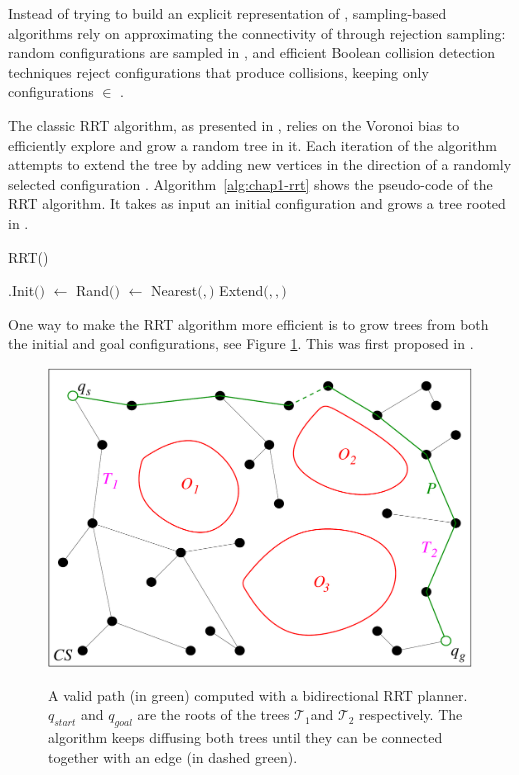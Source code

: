 Instead of trying to build an explicit representation of \cfree,
sampling-based algorithms rely on approximating the connectivity
of \cfree through rejection sampling: random configurations
 are sampled in \cspace, and efficient Boolean collision
detection techniques \cite{vand97, huds97, gott96} reject
configurations that produce collisions, keeping only configurations
\config{} $\in$ \cfree.

The classic RRT algorithm, as presented in \cite{kuff00}, relies on
the Voronoi bias to efficiently explore \cfree and grow a random tree
in it. Each iteration of the algorithm attempts to extend the tree by
adding new vertices in the direction of a randomly selected
configuration . Algorithm~\ref{alg:chap1-rrt} shows the
pseudo-code of the RRT algorithm. It takes as input an initial
configuration  and grows a tree \ctree rooted in .

\begin{algorithm}
\caption{RRT()}
\label{alg:chap1-rrt}
\begin{algorithmic}
\STATE \ctree$.$Init$($$)$
\STATE {} $ \leftarrow $ Rand$($\cspace$)$
\STATE {}$ \leftarrow $ Nearest$($$,$\ctree$)$
\STATE Extend$($\ctree$,$$,$$)$
\ENDFOR
\end{algorithmic}
\end{algorithm}

One way to make the RRT algorithm more efficient is to grow trees from
both the initial and goal configurations, see Figure
\ref{fig:chap1-rrt}. This was first proposed in \cite{kuff00}.

\begin{figure}
  \centering
      {\includegraphics[width = 0.8\linewidth]
        {src/chap1-path-optimization/rrt.pdf}}
      \caption{A valid path (in green) computed with a bidirectional
        RRT planner. $q_{start}$ and $q_{goal}$ are the roots of the
        trees $\mathcal{T}_{1}$and $\mathcal{T}_{2}$ respectively. The
        algorithm keeps diffusing both trees until they can be
        connected together with an edge (in dashed green).}
      \label{fig:chap1-rrt}
\end{figure}

